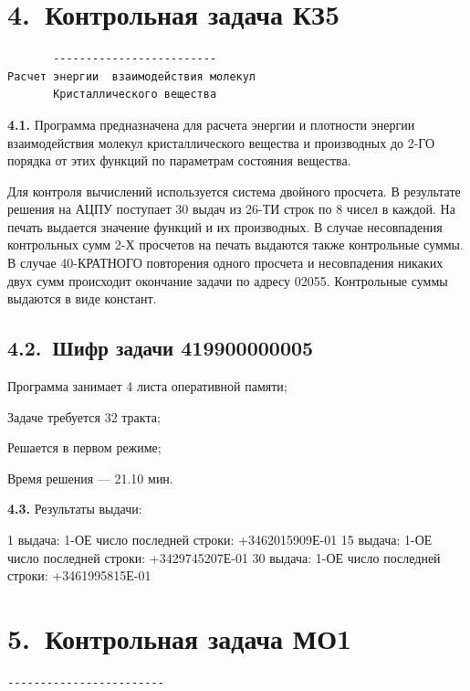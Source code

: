 \documentclass[11pt,a4paper]{article}
\begin{document}
\section*{4.~Контрольная задача КЗ5}
\begin{center}\small
\begin{BVerbatim}
       -------------------------
Расчет энергии  взаимодействия молекул
       Кристаллического вещества
\end{BVerbatim}
\end{center}

\par\textbf{4.1.} Программа предназначена для расчета энергии и плотности энергии взаимодействия молекул кристаллического вещества и производных до 2-ГО порядка от этих функций по параметрам состояния вещества.\par
Для контроля вычислений используется система двойного просчета. В результате решения на АЦПУ поступает 30 выдач из 26-ТИ строк по 8 чисел в каждой. На печать выдается значение функций и их производных. В случае несовпадения контрольных сумм 2-Х просчетов на печать выдаются также контрольные суммы. В случае 40-КРАТНОГО повторения одного просчета и несовпадения никаких двух сумм происходит окончание задачи по адресу 02055. Контрольные суммы выдаются в виде констант.

\subsection*{4.2.~Шифр задачи 419900000005}
Программа занимает 4 листа оперативной памяти;

Задаче требуется 32 тракта;

Решается в первом режиме;

Время решения --- 21.10 мин.

\par\textbf{4.3.} Результаты выдачи:\par
1 выдача: 1-ОЕ число последней строки: +3462015909Е-01 15 выдача: 1-ОЕ число последней строки: +3429745207Е-01 30 выдача: 1-ОЕ число последней строки: +3461995815Е-01

\section*{5.~Контрольная задача МО1}
\begin{center}\small
\begin{BVerbatim}
------------------------
\end{BVerbatim}
\end{center}
\end{document}

